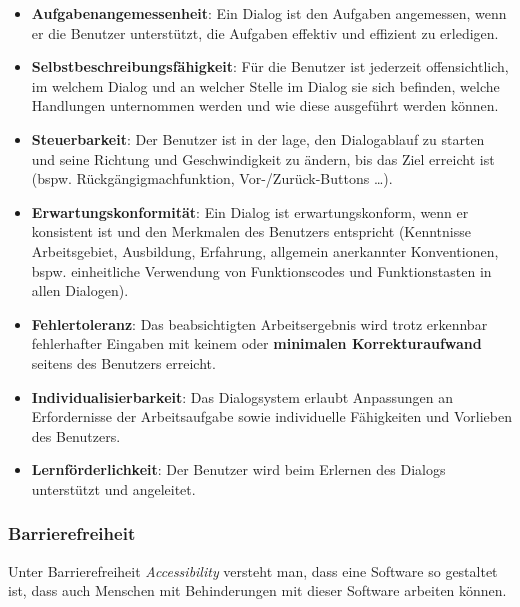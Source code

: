 \begin{itemize}
    \item \textbf{Aufgabenangemessenheit}: Ein Dialog ist den Aufgaben angemessen, wenn er die Benutzer unterstützt, die Aufgaben effektiv und effizient zu erledigen.
    \item \textbf{Selbstbeschreibungsfähigkeit}: Für die Benutzer ist jederzeit offensichtlich, im welchem Dialog und an welcher Stelle im Dialog sie sich befinden, welche Handlungen unternommen werden und wie diese ausgeführt werden können.
    \item \textbf{Steuerbarkeit}: Der Benutzer ist in der lage, den Dialogablauf zu starten und seine Richtung und Geschwindigkeit zu ändern, bis das Ziel erreicht ist (bspw. Rückgängigmachfunktion, Vor-/Zurück-Buttons \ldots).
    \item \textbf{Erwartungskonformität}: Ein Dialog ist erwartungskonform, wenn er konsistent ist und den Merkmalen des Benutzers entspricht (Kenntnisse Arbeitsgebiet, Ausbildung, Erfahrung, allgemein anerkannter Konventionen, bspw. einheitliche Verwendung von Funktionscodes und Funktionstasten in allen Dialogen).
    \item \textbf{Fehlertoleranz}: Das beabsichtigten Arbeitsergebnis wird trotz erkennbar fehlerhafter Eingaben mit keinem oder \textbf{minimalen Korrekturaufwand} seitens des Benutzers erreicht.
    \item \textbf{Individualisierbarkeit}: Das Dialogsystem erlaubt Anpassungen an Erfordernisse der Arbeitsaufgabe sowie individuelle Fähigkeiten und Vorlieben des Benutzers.
    \item \textbf{Lernförderlichkeit}: Der Benutzer wird beim Erlernen des Dialogs unterstützt und angeleitet.
\end{itemize}

\subsubsection*{Barrierefreiheit}
Unter Barrierefreiheit \textit{Accessibility} versteht man, dass eine Software so gestaltet ist, dass auch Menschen mit Behinderungen mit dieser Software arbeiten können.
